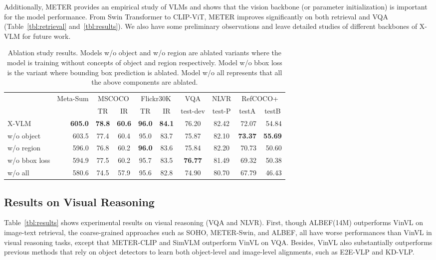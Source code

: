 \documentclass[nohyperref]{article}
\theoremstyle{plain}
\theoremstyle{definition}
\theoremstyle{remark}
\begin{document}
Additionally, METER provides an empirical study of VLMs and shows that the vision backbone (or parameter initialization) is important for the model performance. From Swin Transformer to CLIP-ViT, METER improves significantly on both retrieval and VQA (Table~\ref{tbl:retrieval} and~\ref{tbl:results}). We also have some preliminary observations and leave detailed studies of different backbones of X-VLM for future work. 



\begin{table*}[t]
	\caption
	{
		Ablation study results. Models w/o object and w/o region are ablated variants where the model is training without concepts of object and region respectively. Model w/o bbox loss is the variant where bounding box prediction is ablated. Model w/o all represents that all the above components are ablated. 
	}
	\label{tbl:ablation}
\small
	\centering	
\begin{tabular}	{l | r | c  c  c  c  c c r r }
		\toprule	 	
	 & \multicolumn{1}{c|}{Meta-Sum} & \multicolumn{2}{c}{MSCOCO} & \multicolumn{2}{c}{Flickr30K} & VQA & NLVR & \multicolumn{2}{c}{RefCOCO+} \\
	 & & TR & IR & TR & IR & test-dev & test-P & \multicolumn{1}{c}{testA} & \multicolumn{1}{c}{testB} \\
	\midrule
    X-VLM & \textbf{605.0} &  \textbf{78.8} & \textbf{60.6} & \textbf{96.0} & \textbf{84.1} & 76.20 & 82.42 & 72.07 & 54.84 \\  
	\midrule
    w/o object & 603.5 & 77.4  & 60.4   & 95.0  & 83.7 & 75.87  & 82.10 & \textbf{73.37} & \textbf{55.69} \\  
    w/o region & 596.0 & 76.8 & 60.2  & \textbf{96.0} & 83.6 & 75.84  & 82.20 & 70.73 & 50.60 \\ 
    w/o bbox loss & 594.9 & 77.5 & 60.2 & 95.7 & 83.5 & \textbf{76.77} & 81.49 & 69.32 & 50.38 \\
    w/o all & 580.6 & 74.5 & 57.9 & 95.6 & 82.8 & 74.90  & 80.70 & 67.79 & 46.43 \\
		\bottomrule
	\end{tabular}
\end{table*}



\subsection{Results on Visual Reasoning}


Table~\ref{tbl:results} shows experimental results on visual reasoning (VQA and NLVR). First, though ALBEF(14M) outperforms VinVL on image-text retrieval, the coarse-grained approaches such as SOHO, METER-Swin, and ALBEF, all have worse performances than VinVL in visual reasoning tasks, except that METER-CLIP and SimVLM outperform VinVL on VQA. Besides, VinVL also substantially outperforms previous methods that rely on object detectors to learn both object-level and image-level alignments, such as E2E-VLP and KD-VLP. 
\end{document}
